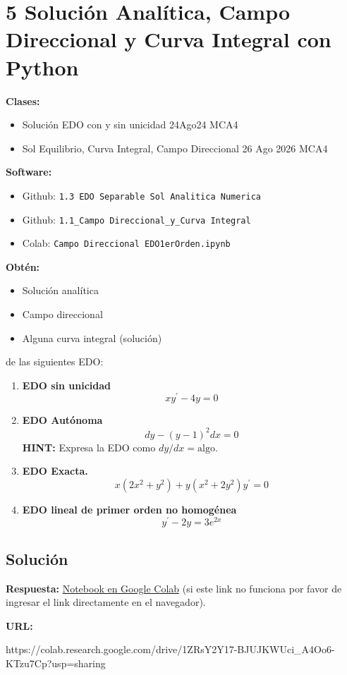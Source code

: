 \section{5 Solución Analítica, Campo Direccional y Curva Integral con Python}

\begin{tcolorbox}[enunciado]
\textbf{Clases:}
\begin{itemize}[leftmargin=*]
    \item Solución EDO con y sin unicidad 24Ago24 MCA4
    \item Sol Equilibrio, Curva Integral, Campo Direccional 26 Ago 2026 MCA4
\end{itemize}

\textbf{Software:}
\begin{itemize}[leftmargin=*]
    \item Github: \texttt{1.3 EDO Separable Sol Analitica Numerica}
    \item Github: \texttt{1.1\_Campo Direccional\_y\_Curva Integral}
    \item Colab: \texttt{Campo Direccional EDO1erOrden.ipynb}
\end{itemize}
\end{tcolorbox}

\vspace{0.3cm}
\textbf{Obtén:}
\begin{itemize}[leftmargin=*]
    \item Solución analítica
    \item Campo direccional
    \item Alguna curva integral (solución)
\end{itemize}
de las siguientes EDO:

\begin{enumerate}[label=\arabic*., leftmargin=*]
    \item \textbf{EDO sin unicidad}
    \[ xy^{\prime}-4y=0 \]
    
    \item \textbf{EDO Autónoma}
    \[ dy-(y-1)^{2}dx=0 \]
    \textbf{HINT:} Expresa la EDO como $dy/dx=\text{algo}$.
    
    \item \textbf{EDO Exacta.}
    \[ x(2x^{2}+y^{2})+y(x^{2}+2y^{2})y^{\prime}=0 \]
    
    \item \textbf{EDO lineal de primer orden no homogénea}
    \[ y^{\prime}-2y=3e^{2x} \]
\end{enumerate}

\subsection{Solución}

\textbf{Respuesta:} \href{https://colab.research.google.com/drive/1ZRsY2Y17-BJUJKWUci_A4Oo6-KTzu7Cp?usp=sharing}{Notebook en Google Colab} (si este link no funciona por favor de ingresar el link directamente en el navegador).

\textbf{URL:} 

https://colab.research.google.com/drive/1ZRsY2Y17-BJUJKWUci\_A4Oo6-KTzu7Cp?usp=sharing